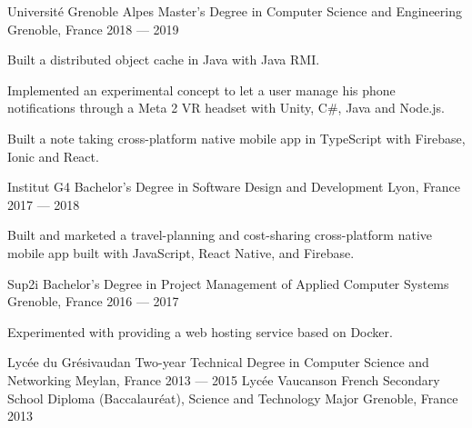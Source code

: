 

\begin{cventries}

  \cventry
    {Université Grenoble Alpes} %
    {Master's Degree in Computer Science and Engineering} %
    {Grenoble, France} %
    {2018 — 2019} %
    {
      \begin{cvitems} %
        \item {Built a distributed object cache in Java with Java RMI.}
        \item {Implemented an experimental concept to let a user manage his phone notifications through a Meta 2 VR headset with Unity, C\#, Java and Node.js.}
        \item {Built a note taking cross-platform native mobile app in TypeScript with Firebase, Ionic and React.}
      \end{cvitems}
    }
  \cventry
    {Institut G4} %
    {Bachelor's Degree in Software Design and Development} %
    {Lyon, France} %
    {2017 — 2018} %
    {
      \begin{cvitems} %
        \item {Built and marketed a travel-planning and cost-sharing cross-platform native mobile app built with JavaScript, React Native, and Firebase.}
      \end{cvitems}
    }
  \cventry
    {Sup2i} %
    {Bachelor's Degree in Project Management of Applied Computer Systems} %
    {Grenoble, France} %
    {2016 — 2017} %
    {
      \begin{cvitems} %
        \item {Experimented with providing a web hosting service based on Docker.}
      \end{cvitems}
    }
  \cventryy
    {Lycée du Grésivaudan} %
    {Two-year Technical Degree in Computer Science and Networking} %
    {Meylan, France} %
    {2013 — 2015} %
  \cventryy
    {Lycée Vaucanson} %
    {French Secondary School Diploma (Baccalauréat), Science and Technology Major} %
    {Grenoble, France} %
    {2013} %
\end{cventries}
